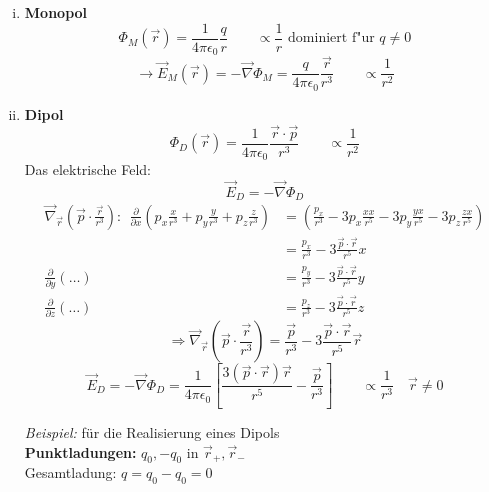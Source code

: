 \begin{enumerate}[i)]
	\item \textbf{Monopol} \[\Phi_M(\vec{r})=\frac{1}{4\pi\epsilon_0}\frac{q}{r} \qquad \propto\frac{1}{r}\textrm{ dominiert f"ur }q\neq0\]
	\[\rightarrow\vec{E}_M(\vec{r})=-\vec{\nabla}\Phi_M=\frac{q}{4\pi\epsilon_0}\frac{\vec{r}}{r^3} \qquad \propto\frac{1}{r^2}\]
	\item \textbf{Dipol} \[\Phi_D(\vec{r})=\frac{1}{4\pi\epsilon_0}\frac{\vec{r}\cdot\vec{p}}{r^3} \qquad \propto\frac{1}{r^2}\]
	Das elektrische Feld:
	\[\vec{E}_D=-\vec{\nabla}\Phi_D\]
	\begin{align*}
	\vec{\nabla}_{\vec{r}} \left(\vec{p}\cdot\frac{\vec{r}}{r^3}\right) : \ \ \frac{\partial}{\partial x} \left(p_x\frac{x}{r^3}+p_y\frac{y}{r^3}+p_z\frac{z}{r^3}\right) &= \left(\frac{p_x}{r^3} -3 p_x \frac{xx}{r^5}-3p_y\frac{yx}{r^5} -3p_z \frac{zx}{r^5} \right)\\
	&= \frac{p_x}{r^3} -3 \frac{\vec{p}\cdot\vec{r}}{r^5}x\\
	\frac{\partial}{\partial y}(\ldots) &= \frac{p_y}{r^3}-3\frac{\vec{p}\cdot\vec{r}}{r^5}y \\
	\frac{\partial}{\partial z} (\ldots) &= \frac{p_z}{r^3} -3 \frac{\vec{p}\cdot\vec{r}}{r^5} z 
	\end{align*}
	\[\Rightarrow\vec{\nabla}_{\vec{r}}\left(\vec{p}\cdot\frac{\vec{r}}{r^3}\right)=\frac{\vec{p}}{r^3}-3\frac{\vec{p}\cdot\vec{r}}{r^5}\vec{r}\]
	$$\vec{E}_{D} = - \vec{\nabla} \Phi_D= \frac{1}{4\pi\epsilon_0} \left[\frac{3(\vec{p}\cdot\vec{r})\vec{r}}{r^5}-\frac{\vec{p}}{r^3}\right] \qquad \propto \frac{1}{r^3} \quad \vec{r}\neq0$$
	\begin{minipage}{.5\linewidth}
		\emph{Beispiel:} für die Realisierung eines Dipols\\
		\textbf{Punktladungen:} $q_0,-q_0$ in $\vec{r}_+,\vec{r}_-$\\
		Gesamtladung: $q=q_0-q_0=0$
	\end{minipage}%
	\begin{minipage}{.5\linewidth}
		\flushright
\end{minipage}
\end{enumerate}
